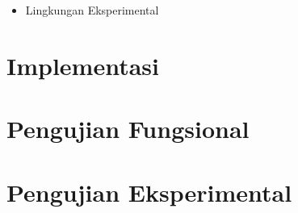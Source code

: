 \begin{itemize}
    \item Lingkungan Eksperimental
\end{itemize}

\section{Implementasi}
\label{sec:5:implementasi}

\section{Pengujian Fungsional}
\label{sec:5:fungsional}

\section{Pengujian Eksperimental}
\label{sec:5:eksperimental}